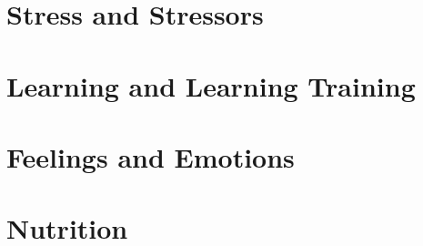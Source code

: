 \documentclass[makeidx]{book}
\begin{document}
\doparttoc
\frontmatter



% 


\mainmatter
\part{Stress and Stressors}
\parttoc


\part{Learning and Learning Training}

\parttoc


\part{Feelings and Emotions}

\parttoc


\part{Nutrition}
\parttoc


\label{part:medicine}



{}

\backmatter
\label{index}\printindex
\end{document}
